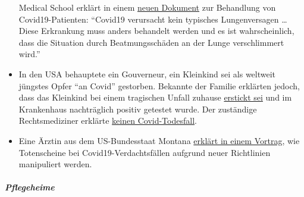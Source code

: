 \begin{itemize}
  Medical School erklärt in einem
  \href{https://www.evms.edu/media/evms_public/departments/internal_medicine/EVMS_Critical_Care_COVID-19_Protocol.pdf}{neuen
  Dokument} zur Behandlung von Covid19-Patienten: ``Covid19 verursacht
  kein typisches Lungenversagen \ldots{} Diese Erkrankung muss anders
  behandelt werden und es ist wahrscheinlich, dass die Situation durch
  Beatmungsschäden an der Lunge verschlimmert wird.''
\item
  In den USA behauptete ein Gouverneur, ein Kleinkind sei als weltweit
  jüngstes Opfer ``an Covid'' gestorben. Bekannte der Familie erklärten
  jedoch, dass das Kleinkind bei einem tragischen Unfall zuhause
  \href{https://www.washingtonexaminer.com/news/candace-owens-accuses-connecticut-governor-of-lying-about-coronavirus-death-calls-for-resignation}{erstickt
  sei} und im Krankenhaus nachträglich positiv getestet wurde. Der
  zuständige Rechtsmediziner erklärte
  \href{https://www.dailymail.co.uk/news/article-8193487/Coroner-refuses-rule-COVID-19-cause-death-six-week-old-Connecticut-baby.html}{keinen
  Covid-Todesfall}.
\item
  Eine Ärztin aus dem US-Bundesstaat Montana
  \href{https://www.youtube.com/watch?v=V0lIWZpiRU0}{erklärt in einem
  Vortrag}, wie Totenscheine bei Covid19-Verdachtsfällen aufgrund neuer
  Richtlinien manipuliert werden.
\end{itemize}

\hypertarget{pflegeheime-1}{%
\subparagraph{\texorpdfstring{\textbf{Pflegeheime}}{Pflegeheime}}\label{pflegeheime-1}}

